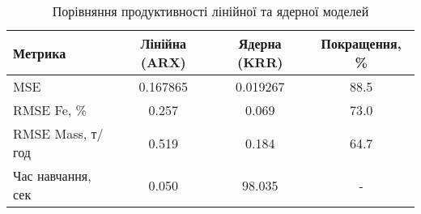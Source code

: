 
    \begin{table}[h]
    \centering
    \caption{Порівняння продуктивності лінійної та ядерної моделей}
    \label{tab:model_comparison}
    \begin{tabular}{|l|c|c|c|}
    \hline
    \textbf{Метрика} & \textbf{Лінійна (ARX)} & \textbf{Ядерна (KRR)} & \textbf{Покращення, \%} \\
    \hline
    MSE & 0.167865 & 0.019267 & 88.5 \\
    \hline
    RMSE Fe, \% & 0.257 & 0.069 & 73.0 \\
    \hline
    RMSE Mass, т/год & 0.519 & 0.184 & 64.7 \\
    \hline
    Час навчання, сек & 0.050 & 98.035 & - \\
    \hline
    \end{tabular}
    \end{table}
    